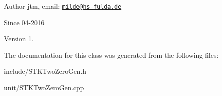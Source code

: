 \begin{DoxyAuthor}{Author}
jtm, email\+:  \href{mailto:milde@hs-fulda.de}{\tt milde@hs-\/fulda.\+de} 
\end{DoxyAuthor}
\begin{DoxySince}{Since}
04-\/2016 
\end{DoxySince}
\begin{DoxyVersion}{Version}
1. 
\end{DoxyVersion}


The documentation for this class was generated from the following files\+:\begin{DoxyCompactItemize}
\item 
include/S\+T\+K\+Two\+Zero\+Gen.\+h\item 
unit/S\+T\+K\+Two\+Zero\+Gen.\+cpp\end{DoxyCompactItemize}
